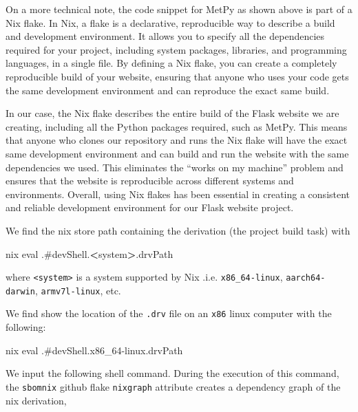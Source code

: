 \documentclass[
]{article}
\newenvironment{Shaded}{\begin{snugshade}}{\end{snugshade}}
\newcommand{\ExtensionTok}[1]{#1}
\newcommand{\NormalTok}[1]{#1}
\newcommand{\OperatorTok}[1]{\textcolor[rgb]{0.81,0.36,0.00}{\textbf{#1}}}
\begin{document}
On a more technical note, the code snippet for MetPy as shown above is part of a Nix flake. In Nix, a flake is a declarative, reproducible way to describe a build and development environment. It allows you to specify all the dependencies required for your project, including system packages, libraries, and programming languages, in a single file. By defining a Nix flake, you can create a completely reproducible build of your website, ensuring that anyone who uses your code gets the same development environment and can reproduce the exact same build.

In our case, the Nix flake describes the entire build of the Flask website we are creating, including all the Python packages required, such as MetPy. This means that anyone who clones our repository and runs the Nix flake will have the exact same development environment and can build and run the website with the same dependencies we used. This eliminates the ``works on my machine'' problem and ensures that the website is reproducible across different systems and environments. Overall, using Nix flakes has been essential in creating a consistent and reliable development environment for our Flask website project.

We find the nix store path containing the derivation (the project build task) with

\begin{Shaded}
\begin{Highlighting}[]
\ExtensionTok{nix}\NormalTok{ eval .\#devShell.}\OperatorTok{\textless{}}\NormalTok{system}\OperatorTok{\textgreater{}}\NormalTok{.drvPath}
\end{Highlighting}
\end{Shaded}

where \texttt{\textless{}system\textgreater{}} is a system supported by Nix .i.e. \texttt{x86\_64-linux}, \texttt{aarch64-darwin},
\texttt{armv7l-linux}, etc.

We find show the location of the \texttt{.drv} file on an \texttt{x86} linux computer with the
following:

\begin{Shaded}
\begin{Highlighting}[]
\ExtensionTok{nix}\NormalTok{ eval .\#devShell.x86\_64{-}linux.drvPath}
\end{Highlighting}
\end{Shaded}

We input the following shell command. During the execution of this command,
the \texttt{sbomnix} github flake \texttt{nixgraph} attribute creates a dependency graph
of the nix derivation,
\end{document}
